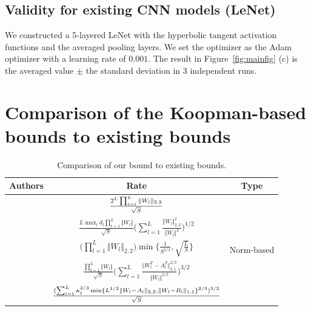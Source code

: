 \documentclass[twoside]{article}
\def\mr{\mathrm}
\begin{document}
\subsection{Validity for existing CNN models (LeNet)}
We constructed a 5-layered LeNet with the hyperbolic tangent activation functions and the averaged pooling layers.
We set the optimizer as the Adam optimizer with a learning rate of $0.001$.
The result in Figure~\ref{fig:mainfig} (c) is the averaged value $\pm$ the standard deviation in 3 independent runs.

\section{Comparison of the Koopman-based bounds to existing bounds}\label{ap:existing_bounds}
\begin{table}[t]
    \centering
    \caption{Comparison of our bound to existing bounds.}
    \begin{tabular}{c|c|c}
        \hline
         Authors & Rate & Type\\
         \hline
         \citet{neyshabur15}& $\frac{2^L\prod_{l=1}^L\Vert W_l\Vert_{2,2}}{\sqrt{S}}\rule{0pt}{15pt}$ & \multirow{7}{*}{Norm-based}\\
         \citet{neyshabur18}&$\frac{L\max_ld_l\prod_{l=1}^L\Vert W_l\Vert}{\sqrt{S}}\Big(\sum_{l=1}^L\frac{\Vert W_l\Vert_{2,2}^2}{\Vert W_l\Vert^2}\Big)^{1/2}$ & \\
         \citet{golowich18} &$\Big(\prod_{l=1}^L\Vert W_l\Vert_{2,2}\Big)\min\bigg\{\frac1{S^{1/4}},\sqrt{\frac{L}{S}}\bigg\}$ & \\
         \citet{bartlett17}& $\frac{\prod_{l=1}^L\Vert W_l\Vert}{\sqrt{S}}\bigg(\sum_{l=1}^L\frac{\Vert W_l^T-A_l^T\Vert_{2,1}^{2/3}}{\Vert W_l\Vert^{2/3}}\bigg)^{3/2}$ & \\
         \citet{wei20}&$\frac{(\sum_{l=1}^L\kappa_l^{2/3}\min\{L^{1/2}\Vert W_l-A_l\Vert_{2,2},\Vert W_l-B_l\Vert_{1,1}\}^{2/3})^{3/2}}{\sqrt{S}}\rule{0pt}{16pt}$&\\

\end{tabular}
\end{table}
\end{document}
